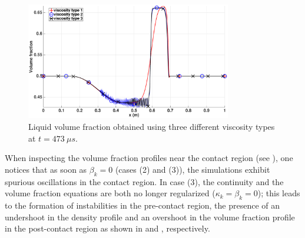 \begin{figure}[H]
        \centering
        \includegraphics[width=0.8\textwidth]{figures/relaxation_liquid_vf_multiple_visc.eps}
        \caption{Liquid volume fraction obtained using three different viscosity types at $t=473 \ \mu s$.}
        \label{fig:liq-vf}
\end{figure}
%
When inspecting the volume fraction profiles near the contact region (see ), one notices that as soon as $\beta_k=0$ 
(cases (2) and (3)), the simulations exhibit spurious oscillations in the contact region. 
In case (3), the continuity and the volume fraction equations are both no longer regularized ($\kappa_k=\beta_k=0$); this leads to 
the formation of instabilities in the pre-contact region, the presence of an undershoot in the density profile and an overshoot in the volume fraction profile in the post-contact region as shown in  and , respectively. 

%
